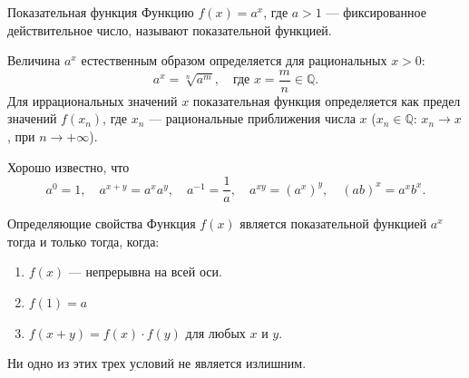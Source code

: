 \documentclass[8pt]{beamer}
\begin{document}

\begin{frame}{Показательная функция}
Функцию $f(x) = a^x$, где $a>1$ --- фиксированное действительное число, называют показательной функцией.

Величина $a^x$ естественным образом определяется для рациональных $x>0$:
$$a^x = \sqrt[n]{a^m},\quad \text{где } x=\frac{m}{n}\in\mathbb{Q}.$$
Для иррациональных значений $x$ показательная функция определяется как предел значений $f(x_n)$, где $x_n$ --- рациональные приближения числа $x$ ($x_n\in\mathbb{Q}$: $x_n\to x$, при $n\to+\infty$).

Хорошо известно, что
$$a^0=1,\quad a^{x+y}=a^x a^y,\quad a^{-1}=\frac{1}{a},\quad a^{x y} = (a^x)^y,\quad (ab)^x = a^x b^x.$$

\begin{block}{Определяющие свойства}
Функция $f(x)$ является показательной функцией $a^x$ тогда и только тогда, когда:
\begin{enumerate}
\item $f(x)$ --- непрерывна на всей оси.
\item $f(1)=a$
\item $f(x+y) = f(x)\cdot f(y)$ для любых $x$ и $y$.
\end{enumerate}
Ни одно из этих трех условий не является излишним.
\end{block}
\end{frame}
\end{document}

